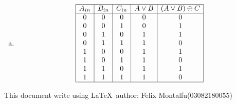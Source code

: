 \documentclass[a4paper]{article}
\begin{document}
\begin{enumerate}[a)]
    \item \begin {displaymath}
      \begin{array}{|c|c|c|c|c|}
        \hline
        A_{in} & B_{in} & C_{in} & A \lor B & (A \lor B)\oplus C\\
        \hline
        0 & 0 & 0 & 0 & 0\\
        0 & 0 & 1 & 0 & 1\\
        0 & 1 & 0 & 1 & 1\\
        0 & 1 & 1 & 1 & 0\\
        1 & 0 & 0 & 1 & 1\\
        1 & 0 & 1 & 1 & 0\\
        1 & 1 & 0 & 1 & 1\\
        1 & 1 & 1 & 1 & 0\\
        \hline
      \end{array}
    \end{displaymath}
    
  \end{enumerate}
  This document write using \LaTeX \ author: Felix Montalfu(03082180055)
\end{document}
